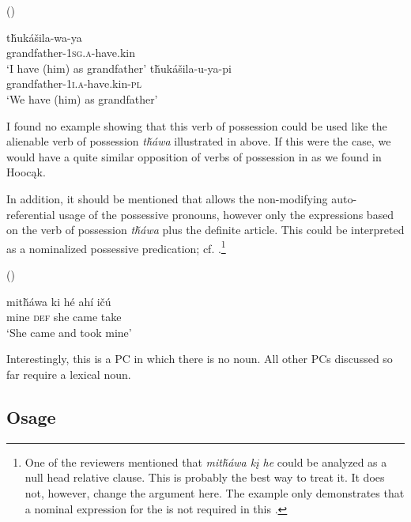 \documentclass[output=paper]{LSP/langsci}
\begin{document}
\ea {} (\citealt[102]{Buechel1939}) \label{lakotahavegrandfather}

\ea \gll t\v{h}ukášila-wa-ya \\
grandfather-\textsc{1sg.a}-have.kin \\
\trans `I have (him) as grandfather'
\ex \gll t\v{h}ukášila-u-ya-pi \\
grandfather-\textsc{1i.a}-have.kin-\textsc{pl} \\
\glt `We have (him) as grandfather'
\z \z

I found no example showing that this verb of possession could be used like the alienable verb of possession \textit{t\v{h}\'awa} illustrated in  above. If this were the case, we would have a quite similar opposition of verbs of possession in  as we found in Hoocąk. 

In addition, it should be mentioned that  allows the non-modifying auto-referential usage of the possessive pronouns, however only the expressions based on the verb of possession \textit{t\v{h}\'awa} plus the definite article. This could be interpreted as a nominalized possessive predication; cf. .\footnote{One of the reviewers mentioned that \textit{mit\v{h}áwa kį he} could be analyzed as a null head relative clause. This is probably the best way to treat it. It does not, however, change the argument here. The example only demonstrates that a nominal expression for the  is not required in this .}

\ea	{} (\citealt[22]{Buechel1939}) \label{lakotatookmine}

\gll mit\v{h}áwa ki      h\'e   ahí     i\v{c}ú \\
mine        \textsc{def} she came take \\
\glt `She came and took mine'
\z

Interestingly, this is a PC in which there is no  noun. All other PCs discussed so far require a  lexical noun.
 
\subsection{Osage}\label{sec:helmbrecht:4.5} \label{osage}
\end{document}
